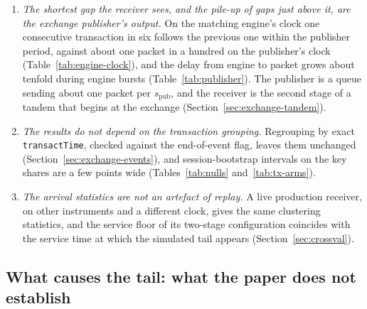 \documentclass[11pt]{article}
\newcommand{\spub}{s_{\mathrm{pub}}}
\begin{document}
\begin{enumerate}
{time.} At short service times it acts through consecutive transactions sent back to back
at the publisher period, most of which the engine processed almost together
(Table~\ref{tab:two-clocks}): a stream with the real gaps in random order keeps most of
the tail there. At long service times it acts through runs of transactions, which the same
shuffle breaks up, keeping little of the tail (Table~\ref{tab:nulls}). The runs are the
self-exciting component of the transaction stream, which a Hawkes fit measures
(Table~\ref{tab:tx-fano}).
    \item \emph{The shortest gap the receiver sees, and the pile-up of gaps just above it,
are the exchange publisher's output.} On the matching engine's clock one consecutive
transaction in six follows the previous one within the publisher period, against about
one packet in a hundred on the publisher's clock (Table~\ref{tab:engine-clock}), and the
delay from engine to packet grows about tenfold during engine bursts
(Table~\ref{tab:publisher}). The publisher is a queue sending about one packet per
$\spub$, and the receiver is the second stage of a tandem that begins at the
exchange (Section~\ref{sec:exchange-tandem}).
    \item \emph{The results do not depend on the transaction grouping.} Regrouping by exact
\texttt{transactTime}, checked against the end-of-event flag, leaves them unchanged
(Section~\ref{sec:exchange-events}), and session-bootstrap intervals on the key shares are
a few points wide (Tables~\ref{tab:nulls} and~\ref{tab:tx-arms}).
    \item \emph{The arrival statistics are not an artefact of replay.} A live production
receiver, on other instruments and a different clock, gives the same clustering
statistics, and the service floor of its two-stage configuration coincides with the
service time at which the simulated tail appears (Section~\ref{sec:crossval}).
\end{enumerate}

\subsection{What causes the tail: what the paper does not establish}
\label{sec:concl-cannot}
\end{document}
